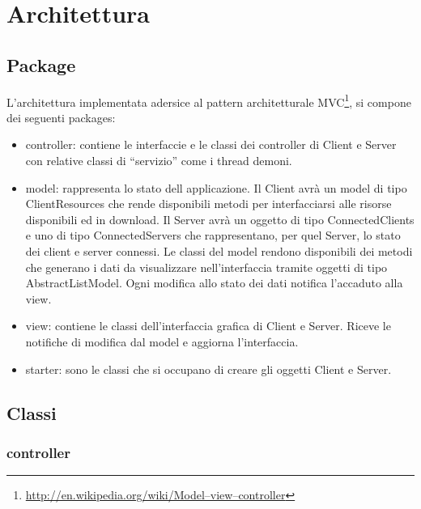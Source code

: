 \documentclass[
10pt, %
a4paper, %
oneside, %
BCOR5mm, %
]{scrartcl}
\begin{document}

\section{Architettura}

	\subsection{Package}
	
	L'architettura implementata adersice al pattern architetturale MVC\footnote{\href{http://en.wikipedia.org/wiki/Model–view–controller}{http://en.wikipedia.org/wiki/Model–view–controller}}, si compone dei seguenti packages:

		\begin{itemize}
			\item controller: contiene le interfaccie e le classi dei controller di Client e Server con relative classi di ``servizio'' come i thread demoni.
			\item model: rappresenta lo stato dell applicazione. Il Client avrà un model di tipo ClientResources che rende disponibili metodi per interfacciarsi alle risorse disponibili ed in download. Il Server avrà un oggetto di tipo ConnectedClients e uno di tipo ConnectedServers che rappresentano, per quel Server, lo stato dei client e server connessi. Le classi del model rendono disponibili dei metodi che generano i dati da visualizzare nell'interfaccia tramite oggetti di tipo AbstractListModel. Ogni modifica allo stato dei dati notifica l'accaduto alla view.
			\item view: contiene le classi dell'interfaccia grafica di Client e Server. Riceve le notifiche di modifica dal model e aggiorna l'interfaccia.
			\item starter: sono le classi che si occupano di creare gli oggetti Client e Server.
		\end{itemize}
	 
	\subsection{Classi}
 		
 		\subsubsection{controller}
\end{document}
